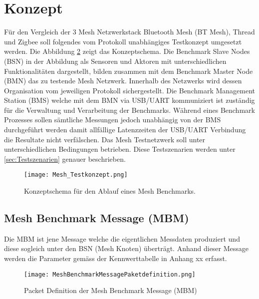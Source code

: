 	\clearpage
\section{Konzept}\label{sec:Konzept}

Für den Vergleich der 3 Mesh Netzwerkstack Bluetooth Mesh (BT Mesh), Thread und Zigbee soll folgendes vom Protokoll unabhängiges Testkonzept umgesetzt werden. 
Die Abbildung \ref{fig:MeshTestKonzept} zeigt das Konzeptschema. Die Benchmark Slave Nodes (BSN) in der Abbildung als Sensoren und Aktoren mit unterschiedlichen Funktionalitäten dargestellt, bilden zusammen mit dem Benchmark Master Node (BMN) das zu testende Mesh Netzwerk. Innerhalb des Netzwerks wird dessen Organisation vom jeweiligen Protokoll sichergestellt. 
Die Benchmark Management Station (BMS) welche mit dem BMN via USB/UART kommuniziert ist zuständig für die Verwaltung und Verarbeitung der Benchmarks. Während eines Benchmark Prozesses sollen sämtliche Messungen jedoch unabhängig von der BMS durchgeführt werden damit allfällige Latenzzeiten der USB/UART Verbindung die Resultate nicht verfälschen.
Das Mesh Testnetzwerk soll unter unterschiedlichen Bedingungen betrieben. Diese Testszenarien werden unter \ref{sec:Testszenarien} genauer beschrieben.


\begin{figure}[H]
	\centering
	\texttt{[image: Mesh\_Testkonzept.png]}
	\caption{Konzeptschema für den Ablauf eines Mesh Benchmarks.}\label{fig:MeshTestKonzept}
\end{figure}



\subsection{Mesh Benchmark Message (MBM)}\label{subsec:MeshBenchmarkMessage}
Die MBM ist jene Message welche die eigentlichen Messdaten produziert und diese sogleich unter den BSN (Mesh Knoten) überträgt. Anhand dieser Message werden die Parameter gemäss der Kennwerttabelle in Anhang xx erfasst.


\begin{figure}[H]
	\centering
	\texttt{[image: MeshBenchmarkMessagePaketdefinition.png]}
	\caption{Packet Definition der Mesh Benchmark Message (MBM)}\label{fig:MeshTestKonzept}
\end{figure}


